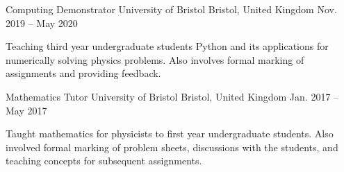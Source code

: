 
\begin{cventries}

    \cventry
      {Computing Demonstrator} %
      {University of Bristol} %
      {Bristol, United Kingdom} %
      {Nov. 2019 -- May 2020} %
      {
        \begin{cvitems} %
          \item{Teaching third year undergraduate students Python and its applications for numerically solving physics problems. Also involves formal marking of assignments and providing feedback.}
        \end{cvitems}
      }

    \cventry
      {Mathematics Tutor} %
      {University of Bristol} %
      {Bristol, United Kingdom} %
      {Jan. 2017 -- May 2017} %
      {
        \begin{cvitems} %
          \item{Taught mathematics for physicists to first year undergraduate students. Also involved formal marking of problem sheets, discussions with the students, and teaching concepts for subsequent assignments.}
        \end{cvitems}
      }

\end{cventries}
